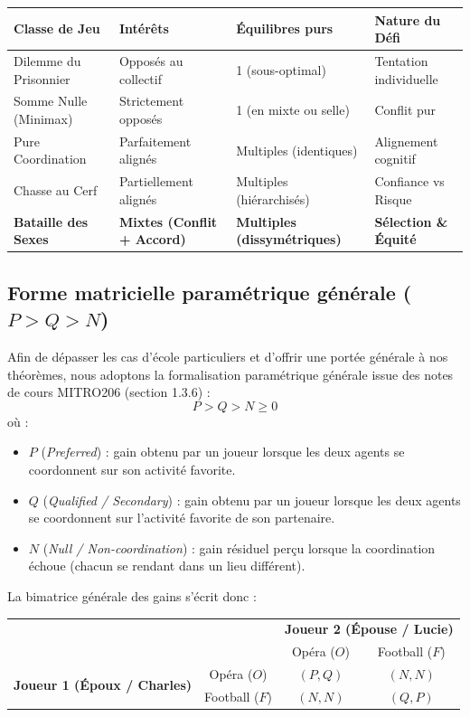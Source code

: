 \documentclass[11pt,a4paper]{article}
\begin{document}
\begin{center}
\small
\renewcommand{\arraystretch}{1.25}
\begin{tabular}{p{3.8cm}p{3.5cm}p{3.2cm}p{3.8cm}}
\toprule
\textbf{Classe de Jeu} & \textbf{Intérêts} & \textbf{Équilibres purs} & \textbf{Nature du Défi} \\
\midrule
Dilemme du Prisonnier & Opposés au collectif & 1 (sous-optimal) & Tentation individuelle \\
Somme Nulle (Minimax) & Strictement opposés & 1 (en mixte ou selle) & Conflit pur \\
Pure Coordination & Parfaitement alignés & Multiples (identiques) & Alignement cognitif \\
Chasse au Cerf & Partiellement alignés & Multiples (hiérarchisés) & Confiance vs Risque \\
\textbf{Bataille des Sexes} & \textbf{Mixtes (Conflit + Accord)} & \textbf{Multiples (dissymétriques)} & \textbf{Sélection \& Équité} \\
\bottomrule
\end{tabular}
\end{center}

\subsection{Forme matricielle paramétrique générale \texorpdfstring{($P > Q > N$)}{(P > Q > N)}}
Afin de dépasser les cas d'école particuliers et d'offrir une portée générale à nos théorèmes, nous adoptons la formalisation paramétrique générale issue des notes de cours MITRO206 (section 1.3.6) :
\begin{equation}\label{eq:ordre_param}
P > Q > N \ge 0
\end{equation}
où :
\begin{itemize}[leftmargin=1.5em]
    \item $P$ (\emph{Preferred}) : gain obtenu par un joueur lorsque les deux agents se coordonnent sur son activité favorite.
    \item $Q$ (\emph{Qualified / Secondary}) : gain obtenu par un joueur lorsque les deux agents se coordonnent sur l'activité favorite de son partenaire.
    \item $N$ (\emph{Null / Non-coordination}) : gain résiduel perçu lorsque la coordination échoue (chacun se rendant dans un lieu différent).
\end{itemize}

La bimatrice générale des gains s'écrit donc :
\begin{center}
\renewcommand{\arraystretch}{1.4}
\begin{tabular}{cc|cc}
& & \multicolumn{2}{c}{\textbf{Joueur 2 (Épouse / Lucie)}} \\
& & Opéra ($O$) & Football ($F$) \\ \hline
\multirow{2}{*}{\textbf{Joueur 1 (Époux / Charles)}} & Opéra ($O$) & $(P, Q)$ & $(N, N)$ \\
& Football ($F$) & $(N, N)$ & $(Q, P)$ \\
\end{tabular}
\end{center}
\end{document}

